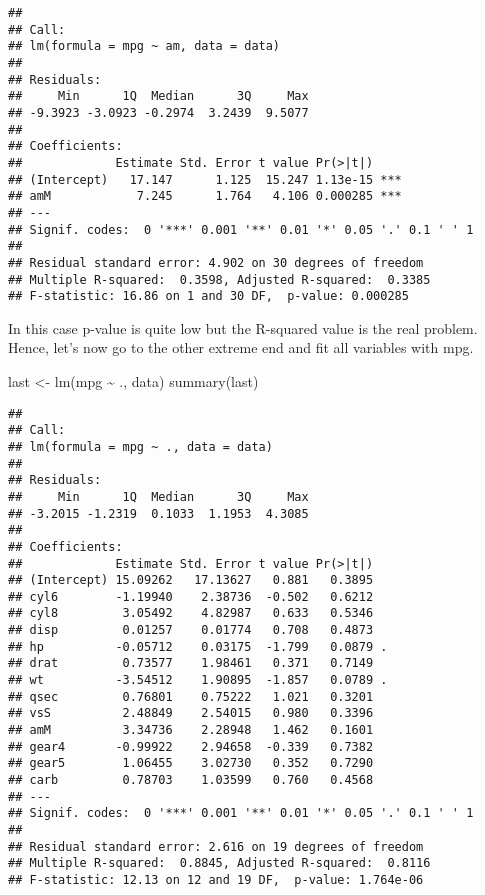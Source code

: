 \documentclass[
]{article}
\newenvironment{Shaded}{\begin{snugshade}}{\end{snugshade}}
\newcommand{\FunctionTok}[1]{\textcolor[rgb]{0.00,0.00,0.00}{#1}}
\newcommand{\NormalTok}[1]{#1}
\newcommand{\OtherTok}[1]{\textcolor[rgb]{0.56,0.35,0.01}{#1}}
\newcommand{\SpecialCharTok}[1]{\textcolor[rgb]{0.00,0.00,0.00}{#1}}
\begin{document}
\begin{verbatim}
## 
## Call:
## lm(formula = mpg ~ am, data = data)
## 
## Residuals:
##     Min      1Q  Median      3Q     Max 
## -9.3923 -3.0923 -0.2974  3.2439  9.5077 
## 
## Coefficients:
##             Estimate Std. Error t value Pr(>|t|)    
## (Intercept)   17.147      1.125  15.247 1.13e-15 ***
## amM            7.245      1.764   4.106 0.000285 ***
## ---
## Signif. codes:  0 '***' 0.001 '**' 0.01 '*' 0.05 '.' 0.1 ' ' 1
## 
## Residual standard error: 4.902 on 30 degrees of freedom
## Multiple R-squared:  0.3598, Adjusted R-squared:  0.3385 
## F-statistic: 16.86 on 1 and 30 DF,  p-value: 0.000285
\end{verbatim}

In this case p-value is quite low but the R-squared value is the real
problem. Hence, let's now go to the other extreme end and fit all
variables with mpg.

\begin{Shaded}
\begin{Highlighting}[]
\NormalTok{last }\OtherTok{\textless{}{-}} \FunctionTok{lm}\NormalTok{(mpg }\SpecialCharTok{\textasciitilde{}}\NormalTok{ ., data)}
\FunctionTok{summary}\NormalTok{(last)}
\end{Highlighting}
\end{Shaded}

\begin{verbatim}
## 
## Call:
## lm(formula = mpg ~ ., data = data)
## 
## Residuals:
##     Min      1Q  Median      3Q     Max 
## -3.2015 -1.2319  0.1033  1.1953  4.3085 
## 
## Coefficients:
##             Estimate Std. Error t value Pr(>|t|)  
## (Intercept) 15.09262   17.13627   0.881   0.3895  
## cyl6        -1.19940    2.38736  -0.502   0.6212  
## cyl8         3.05492    4.82987   0.633   0.5346  
## disp         0.01257    0.01774   0.708   0.4873  
## hp          -0.05712    0.03175  -1.799   0.0879 .
## drat         0.73577    1.98461   0.371   0.7149  
## wt          -3.54512    1.90895  -1.857   0.0789 .
## qsec         0.76801    0.75222   1.021   0.3201  
## vsS          2.48849    2.54015   0.980   0.3396  
## amM          3.34736    2.28948   1.462   0.1601  
## gear4       -0.99922    2.94658  -0.339   0.7382  
## gear5        1.06455    3.02730   0.352   0.7290  
## carb         0.78703    1.03599   0.760   0.4568  
## ---
## Signif. codes:  0 '***' 0.001 '**' 0.01 '*' 0.05 '.' 0.1 ' ' 1
## 
## Residual standard error: 2.616 on 19 degrees of freedom
## Multiple R-squared:  0.8845, Adjusted R-squared:  0.8116 
## F-statistic: 12.13 on 12 and 19 DF,  p-value: 1.764e-06
\end{verbatim}
\end{document}
